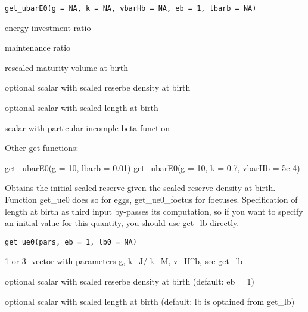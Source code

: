 \documentclass[a4paper]{book}
\begin{document}
%
\begin{Usage}
\begin{verbatim}
get_ubarE0(g = NA, k = NA, vbarHb = NA, eb = 1, lbarb = NA)
\end{verbatim}
\end{Usage}
%
\begin{Arguments}
\begin{ldescription}
\item[\code{g}] energy investment ratio

\item[\code{k}] maintenance ratio

\item[\code{vbarHb}] rescaled maturity volume at birth

\item[\code{eb}] optional scalar with scaled reserbe density at birth

\item[\code{lbarb}] optional scalar with scaled length at birth
\end{ldescription}
\end{Arguments}
%
\begin{Value}
scalar with particular incomple beta function
\end{Value}
%
\begin{SeeAlso}\relax
Other get functions: 
\end{SeeAlso}
%
\begin{Examples}
\begin{ExampleCode}
get_ubarE0(g = 10, lbarb = 0.01)
get_ubarE0(g = 10, k = 0.7, vbarHb = 5e-4)
\end{ExampleCode}
\end{Examples}
%
\begin{Description}\relax
Obtains the initial scaled reserve given the scaled reserve density at birth.
Function get\_ue0 does so for eggs, get\_ue0\_foetus for foetuses.
Specification of length at birth as third input by-passes its computation,
so if you want to specify an initial value for this quantity, you should use get\_lb directly.
\end{Description}
%
\begin{Usage}
\begin{verbatim}
get_ue0(pars, eb = 1, lb0 = NA)
\end{verbatim}
\end{Usage}
%
\begin{Arguments}
\begin{ldescription}
\item[\code{pars}] 1 or 3 -vector with parameters g, k\_J/ k\_M, v\_H\textasciicircum{}b, see get\_lb

\item[\code{eb}] optional scalar with scaled reserbe density at birth (default: eb = 1)

\item[\code{lb0}] optional scalar with scaled length at birth (default: lb is optained from get\_lb)
\end{ldescription}
\end{Arguments}
\end{document}
